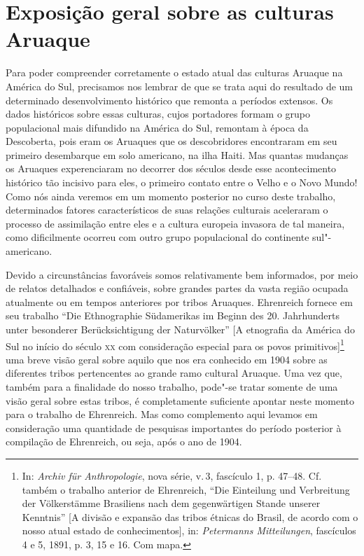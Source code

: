 
\chapter{Exposição geral sobre as culturas Aruaque}

Para poder compreender corretamente o estado atual das culturas Aruaque
na América do Sul, precisamos nos lembrar de que se trata aqui do
resultado de um determinado desenvolvimento histórico que remonta a
períodos extensos. Os dados históricos sobre essas culturas, cujos
portadores formam o grupo populacional mais difundido na América do Sul,
remontam à época da Descoberta, pois eram os Aruaques que os
descobridores encontraram em seu primeiro desembarque em solo americano,
na ilha Haiti. Mas quantas mudanças os Aruaques experenciaram no
decorrer dos séculos desde esse acontecimento histórico tão incisivo
para eles, o primeiro contato entre o Velho e o Novo Mundo! Como nós
ainda veremos em um momento posterior no curso deste trabalho,
determinados fatores característicos de suas relações culturais
aceleraram o processo de assimilação entre eles e a cultura europeia
invasora de tal maneira, como dificilmente ocorreu com outro grupo
populacional do continente sul"-americano.

Devido a circunstâncias favoráveis somos relativamente bem informados,
por meio de relatos detalhados e confiáveis, sobre grandes partes da
vasta região ocupada atualmente ou em tempos anteriores por tribos
Aruaques. Ehrenreich fornece em seu trabalho ``Die Ethnographie
Südamerikas im Beginn des 20. Jahrhunderts unter besonderer
Berücksichtigung der Naturvölker'' {[}A etnografia da América do Sul no
início do século \textsc{xx} com consideração especial para os povos
primitivos{]}\footnote{In: \emph{Archiv für Anthropologie}, nova série,
  v.\,3, fascículo 1, p. 47--48. Cf. também o trabalho anterior de
  Ehrenreich, ``Die Einteilung und Verbreitung der Völkerstämme
  Brasiliens nach dem gegenwärtigen Stande unserer Kenntnis'' {[}A
  divisão e expansão das tribos étnicas do Brasil, de acordo com o nosso
  atual estado de conhecimentos{]}, in: \emph{Petermanns Mitteilungen},
  fascículos 4 e 5, 1891, p. 3, 15 e 16. Com mapa.} uma breve visão
geral sobre aquilo que nos era conhecido em 1904 sobre as diferentes
tribos pertencentes ao grande ramo cultural Aruaque. Uma vez que, também
para a finalidade do nosso trabalho, pode"-se tratar somente de uma
visão geral sobre estas tribos, é completamente suficiente apontar neste
momento para o trabalho de Ehrenreich. Mas como complemento aqui
levamos em consideração uma quantidade de pesquisas importantes do
período posterior à compilação de Ehrenreich, ou seja, após o ano de
1904.

